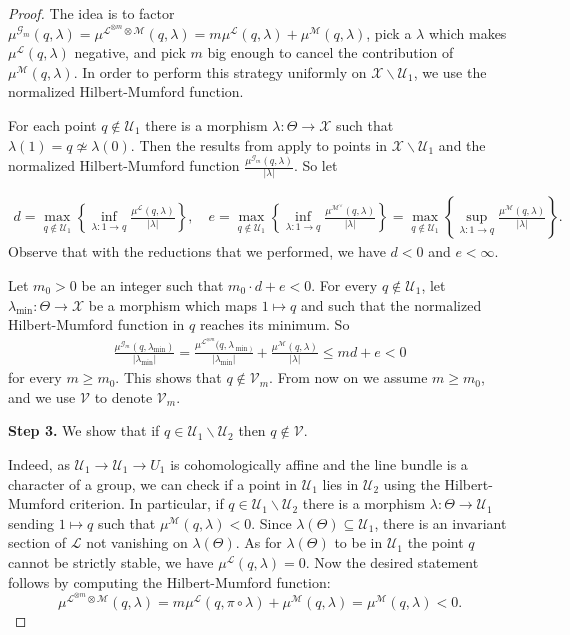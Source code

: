 \documentclass{amsart}
\newcommand{\cG}{\mathcal{G}}
\newcommand{\cL}{\mathcal{L}}
\newcommand{\cM}{\mathcal{M}}
\newcommand{\cU}{\mathcal{U}}
\newcommand{\cV}{\mathcal{V}}
\newcommand{\cX}{\mathcal{X}}
\theoremstyle{definition}
\theoremstyle{definition}
\begin{document}
{\begin{proof}
The idea is to factor $\mu^{\cG_m}(q,\lambda) = \mu^{\cL^{\otimes m}\otimes \cM}(q,\lambda) = m\mu^{\cL}(q,\lambda) + \mu^{ \cM}(q,\lambda)$, pick a $\lambda$ which makes $\mu^{\cL}(q, \lambda) $ negative, and pick $m$ big enough to cancel the contribution of $\mu^{ \cM}(q,\lambda)$. In order to perform this strategy uniformly on $\cX\smallsetminus \cU_1$, we use the normalized Hilbert-Mumford function.

For each point $q\not\in \cU_1$ there is a morphism $\lambda\colon\Theta\to \cX$ such that $\lambda(1)=q\not\simeq\lambda(0)$. Then the results from  apply to points in $\cX\smallsetminus\cU_1$ and the normalized Hilbert-Mumford function $\frac{\mu^{\cG_m}(q,\lambda)}{|\lambda|}$. So let
 
\begin{align*}d=\max_{q \notin \cU_1} \left\{ \inf_{\lambda\colon 1 \to q} \frac{\mu^{\cL}(q,\lambda)} {|\lambda|} \right\},\quad e=\max_{q\notin \cU_1} \left\{\inf_{\lambda\colon 1 \to q} \frac{\mu^{\cM^{\vee}}(q,\lambda)}{|\lambda|} \right\}
    =\max_{q\notin \cU_1} \left\{\sup_{\lambda\colon 1 \to q} \frac{\mu^{\cM}(q,\lambda)}{|\lambda|} \right\}.
\end{align*}
Observe that with the reductions that we performed, we have $d<0$ and $e<\infty$.

Let $m_0>0$ be an integer such that $m_0\cdot d + e < 0$. For every $q\not \in \cU_1$, let $\lambda_{\min}\colon\Theta\to \cX$ be a morphism which maps $1\mapsto q$ and such that the normalized Hilbert-Mumford function in $q$ reaches its minimum. So
\begin{align*}
    \frac{\mu^{\cG_m}(q,\lambda_{\min})}{|\lambda_{\min}|} = \frac{\mu^{\cL^{\otimes m}}(q,\lambda_{\min)}}{|\lambda_{\min}|} + \frac{\mu^{\cM}(q,\lambda)}{|\lambda|} \le md + e <0
\end{align*}
for every $m\geq m_0$. This shows that $q\notin \cV_m$.
From now on we assume $m\geq m_0$, and we use $\cV$ to denote $\cV_m$.

    \noindent
    \textbf{Step 3.} We show that if $q\in \cU_1\smallsetminus\cU_2$ then $q\notin \cV$.

    Indeed, as $\cU_1\to \cU_1\to U_1$ is cohomologically affine and the line bundle is a character of a group, we can check if a point in $\cU_1$ lies in $\cU_2$ using the Hilbert-Mumford criterion. In particular, if $q\in \cU_1\smallsetminus\cU_2$ there is a morphism $\lambda:\Theta\to \cU_1$ sending $1\mapsto q$ such that $\mu^{\cM}(q,\lambda)<0$. Since $\lambda(\Theta)\subseteq \cU_1$, there is an invariant section of $\cL$ not vanishing on $\lambda(\Theta)$. As for $\lambda(\Theta)$ to be in $\cU_1$ the point $q$ cannot be strictly stable, we have $\mu^{{\cL}}(q,\lambda)=0$. Now the desired statement follows by computing the Hilbert-Mumford function: 
    \[\mu^{\cL^{\otimes m}\otimes \cM}(q,\lambda) = m\mu^{\cL}(q,\pi\circ\lambda) + \mu^{\cM}(q,\lambda) = \mu^{\cM}(q,\lambda)<0.\]


\end{proof}}
\end{document}
